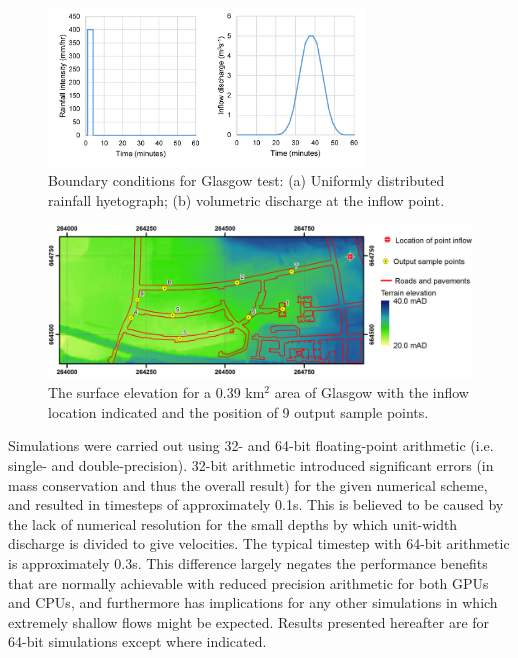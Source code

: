 \begin{figure}[tpb]
\centering
\includegraphics[width=0.75\textwidth]{heterogeneous-dev-figures/Glasgow_Inflow.png}
\caption{Boundary conditions for Glasgow test: (a) Uniformly distributed rainfall hyetograph; (b) volumetric discharge at the inflow point.}
\label{Glasgow_Inflows}
\end{figure}
\begin{figure}[tpb]
\centering
\includegraphics[width=1.0\textwidth]{heterogeneous-dev-figures/Glasgow_DTM.png}
\caption{The surface elevation for a 0.39 km$^{2}$ area of Glasgow with the inflow location indicated and the position of 9 output sample points.}
\label{Glasgow_DTM}
\end{figure}

Simulations were carried out using 32- and 64-bit floating-point arithmetic (i.e. single- and double-precision). 32-bit arithmetic introduced significant errors (in mass conservation and thus the overall result) for the given numerical scheme, and resulted in timesteps of approximately 0.1s. This is believed to be caused by the lack of numerical resolution for the small depths by which unit-width discharge is divided to give velocities. The typical timestep with 64-bit arithmetic is approximately 0.3s. This difference largely negates the performance benefits that are normally achievable with reduced precision arithmetic for both GPUs and CPUs, and furthermore has implications for any other simulations in which extremely shallow flows might be expected. Results presented hereafter are for 64-bit simulations except where indicated.


